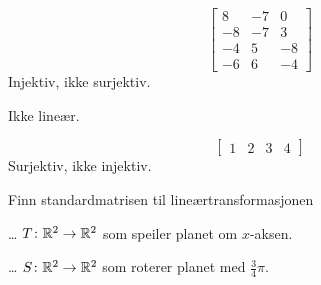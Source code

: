 \begin{losning}


\begin{punkt}
$$\begin{bmatrix}
8 & -7 & 0\\
-8 & -7 & 3\\
-4 & 5 & -8\\
-6 & 6 & -4
\end{bmatrix}$$
Injektiv, ikke surjektiv.
\end{punkt}

\begin{punkt}
Ikke lineær.
\end{punkt}

\begin{punkt}
$$\begin{bmatrix}
1 & 2 & 3 & 4
\end{bmatrix}$$
Surjektiv, ikke injektiv.
\end{punkt}




\end{losning}


\begin{oppgave}
Finn standardmatrisen til lineærtransformasjonen
\begin{punkt}
\ldots{} $T \colon \mathbb{R}^2 \to \mathbb{R}^2$ som
speiler planet om $x$-aksen.
\end{punkt}
\begin{punkt}
\ldots{} $S \colon \mathbb{R}^2 \to \mathbb{R}^2$ som
roterer planet med $\frac{3}{4}\pi$.
\end{punkt}
\end{oppgave}

